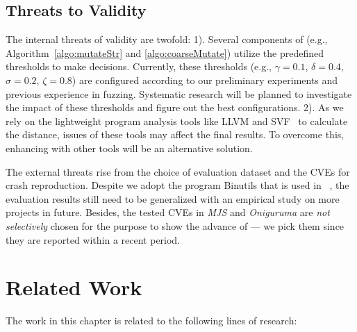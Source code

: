 \subsection{Threats to Validity}

The internal threats of validity are twofold:  1).  Several components of \dFOT (e.g., Algorithm~\ref{algo:mutateStr} and \ref{algo:coarseMutate}) utilize  the predefined thresholds to make decisions. Currently, these thresholds (e.g., $\gamma=0.1$, $\delta=0.4$, $\sigma=0.2$, $\zeta=0.8$) are configured according to our preliminary experiments and  previous experience in fuzzing. Systematic research will be planned to investigate the impact of these thresholds and figure out the best configurations. 
2). As we rely on the lightweight program analysis tools like LLVM and SVF~\cite{Sui:2016:SVF} to calculate the distance, issues of these tools may affect the final results.  To overcome this, enhancing \dFOT with other tools will be an alternative solution. 

The external threats rise from the choice of evaluation dataset and the CVEs for crash reproduction. Despite we adopt the program Binutils that is used in \aflgo~\cite{Bohme:2017:DGF}, the evaluation results still need to be generalized with an empirical study on more projects in future. Besides, the tested CVEs in \emph{MJS} and  \emph{Oniguruma} are \emph{not selectively} chosen for the purpose to show the advance of \dFOT --- we pick them since they are reported within a recent period. 

\section{Related Work}

The work in this chapter is related to the following lines of research:

